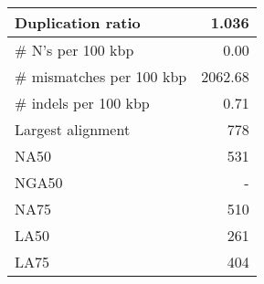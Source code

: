 \documentclass[12pt,a4paper]{article}
\begin{document}
\begin{table}[ht]
\begin{center}
\begin{tabular}{|l*{1}{|r}|}
Duplication ratio & 1.036 \\ \hline
\# N's per 100 kbp & 0.00 \\ \hline
\# mismatches per 100 kbp & 2062.68 \\ \hline
\# indels per 100 kbp & 0.71 \\ \hline
Largest alignment & 778 \\ \hline
NA50 & 531 \\ \hline
NGA50 & - \\ \hline
NA75 & 510 \\ \hline
LA50 & 261 \\ \hline
LA75 & 404 \\ \hline
\end{tabular}
\end{center}
\end{table}
\end{document}
